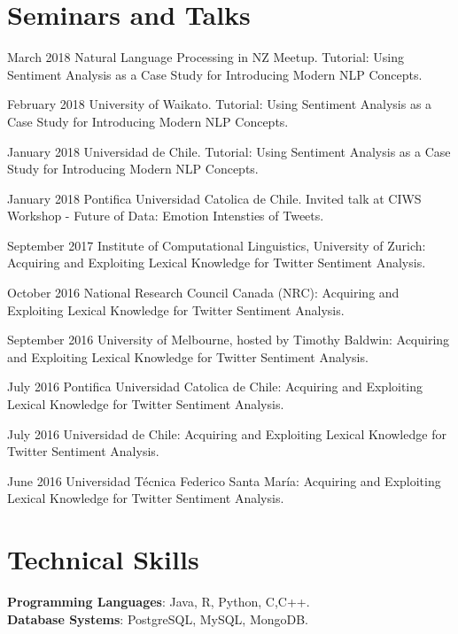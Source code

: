 \documentclass[letterpaper]{article}
\begin{document}
\section{Seminars and Talks}
\begin{CV}
\item [March 2018] Natural Language Processing in NZ Meetup. Tutorial: Using Sentiment Analysis as a Case Study for Introducing Modern NLP Concepts.

\item [February 2018] University of Waikato. Tutorial: Using Sentiment Analysis as a Case Study for Introducing Modern NLP Concepts.

\item [January 2018]Universidad de Chile. Tutorial: Using Sentiment Analysis as a Case Study for Introducing Modern NLP Concepts.

\item [January 2018] Pontifica Universidad Catolica de Chile. Invited talk at CIWS Workshop - Future of Data: Emotion Intensties of Tweets.

\item [September 2017] Institute of Computational Linguistics, University of Zurich:  Acquiring and Exploiting Lexical Knowledge for Twitter Sentiment Analysis.

\item [October 2016] National Research Council Canada (NRC):  Acquiring and Exploiting Lexical Knowledge for Twitter Sentiment Analysis.

\item [September 2016] University of Melbourne, hosted by Timothy Baldwin: Acquiring and Exploiting Lexical Knowledge for Twitter Sentiment Analysis.

\item [July 2016] Pontifica Universidad Catolica de Chile:  Acquiring and Exploiting Lexical Knowledge for Twitter Sentiment Analysis.

\item [July 2016] Universidad de Chile:  Acquiring and Exploiting Lexical Knowledge for Twitter Sentiment Analysis.

\item [June 2016] Universidad Técnica Federico Santa María: Acquiring and Exploiting Lexical Knowledge for Twitter Sentiment Analysis. 
\end{CV}  

\section{Technical Skills}
\begin{flushleft}
\textbf{Programming Languages}: Java, R, Python, C,C++. \\
\textbf{Database Systems}: PostgreSQL, MySQL, MongoDB.\\
\end{flushleft}
\end{document}
